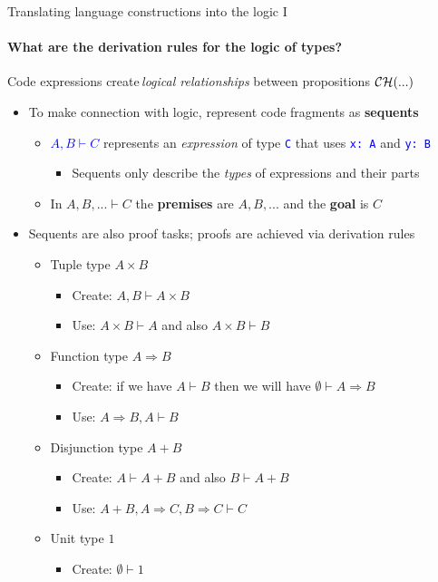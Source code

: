 \documentclass[english]{beamer}
\begin{document}
\begin{frame}{Translating language constructions into the logic I}


\framesubtitle{What are the derivation rules for the logic of types?}

Code expressions create\,\emph{logical relationships} between propositions
${\cal CH}(...)$
\begin{itemize}
\item To make connection with logic, represent code fragments as \textbf{sequents}
\begin{itemize}
\item \textcolor{blue}{$A,B\vdash C$} represents an \emph{expression} of
type \texttt{\textcolor{blue}{\footnotesize{}C}} that uses \texttt{\textcolor{blue}{\footnotesize{}x:\ A}}
and \texttt{\textcolor{blue}{\footnotesize{}y:\ B}}{\footnotesize \par}
\begin{itemize}
\item Sequents only describe the \emph{types} of expressions and their parts
\end{itemize}
\item In $A,B,...\vdash C$ the \textbf{premises} are $A,B,...$ and the
\textbf{goal} is $C$
\end{itemize}
\item Sequents are also proof tasks; proofs are achieved via derivation
rules
\begin{itemize}
\item Tuple type $A\times B$
\begin{itemize}
\item Create: $A,B\vdash A\times B$ 
\item Use: $A\times B\vdash A$ and also $A\times B\vdash B$
\end{itemize}
\item Function type $A\Rightarrow B$
\begin{itemize}
\item Create: if we have $A\vdash B$ then we will have $\emptyset\vdash A\Rightarrow B$ 
\item Use: $A\Rightarrow B,A\vdash B$
\end{itemize}
\item Disjunction type $A+B$
\begin{itemize}
\item Create: $A\vdash A+B$ and also $B\vdash A+B$
\item Use: $A+B,A\Rightarrow C,B\Rightarrow C\vdash C$
\end{itemize}
\item Unit type $1$
\begin{itemize}
\item Create: $\emptyset\vdash1$
\end{itemize}
\end{itemize}
\end{itemize}
\end{frame}
\end{document}
